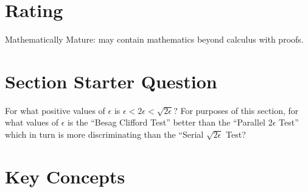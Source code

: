 \documentclass[12pt]{article}
\begin{document}
\myheader
\mytitle

\hr


\hr

\usefirefox

\hr



\section*{Rating} %
Mathematically Mature: may contain mathematics beyond calculus with proofs.

\hr

\section*{Section Starter Question}
For what positive values of $\epsilon$ is $\epsilon < 2 \epsilon < \sqrt{2
  \epsilon}$?  For purposes of this section, for what values of $\epsilon$
is the ``Besag Clifford Test'' better than the
``Parallel \( 2 \epsilon \) Test'' which in turn is more discriminating than the
``Serial \( \sqrt{2 \epsilon} \) Test?

\hr

\section*{Key Concepts}
\end{document}
